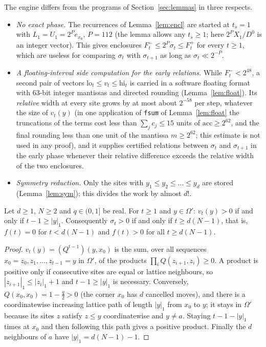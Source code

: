 The engine differs from the programs of Section~\ref{sec:lemmas} in three respects.
\begin{itemize}
\item[(i)] \emph{No exact phase.} The recurrences of Lemma~\ref{lem:encl} are started at $t_s=1$ with $L_1=U_1=2^Pe_{x_0}$, $P=112$ (the lemma allows any $t_s\ge1$; here $2^PX_1/D^0$ is an integer vector). This gives enclosures $F^-_t\le2^P\sigma_t\le F^+_t$ for every $t\ge1$, which are useless for comparing $\sigma_t$ with $\sigma_{t+1}$ as long as $\sigma_t\ll2^{-P}$.
\item[(ii)] \emph{A floating-interval side computation for the early relations.} While $F^-_t<2^{48}$, a second pair of vectors $\mathrm{lo}_t\le v_t\le\mathrm{hi}_t$ is carried in a software floating format with 63-bit integer mantissas and directed rounding (Lemma~\ref{lem:float}). Its \emph{relative} width at every site grows by at most about $2^{-58}$ per step, whatever the size of $v_t(y)$ (in one application of \texttt{fsum} of Lemma~\ref{lem:float} the truncations of the terms cost less than $\sum_jc_j\le15$ units of $\mathrm{acc}\ge2^{62}$, and the final rounding less than one unit of the mantissa $m\ge2^{62}$; this estimate is not used in any proof), and it supplies certified relations between $\sigma_t$ and $\sigma_{t+1}$ in the early phase whenever their relative difference exceeds the relative width of the two enclosures.
\item[(iii)] \emph{Symmetry reduction.} Only the sites with $y_1\le y_2\le\dots\le y_d$ are stored (Lemma~\ref{lem:sym}); this divides the work by almost $d!$.
\end{itemize}

\begin{lemma}\label{lem:support}
Let $d\ge1$, $N\ge2$ and $q\in(0,1]$ be real. For $t\ge1$ and $y\in\Omega'$: $v_t(y)>0$ if and only if $t-1\ge|y|_1$. Consequently $\sigma_t>0$ if and only if $t\ge d(N-1)$, that is, $f(t)=0$ for $t<d(N-1)$ and $f(t)>0$ for all $t\ge d(N-1)$.
\end{lemma}
\begin{proof}
$v_t(y)=(Q^{t-1})(y,x_0)$ is the sum, over all sequences $x_0=z_0,z_1,\dots,z_{t-1}=y$ in $\Omega'$, of the products $\prod_iQ(z_{i+1},z_i)\ge0$. A product is positive only if consecutive sites are equal or lattice neighbours, so $|z_{i+1}|_1\le|z_i|_1+1$ and $t-1\ge|y|_1$ is necessary. Conversely, $Q(x_0,x_0)=1-\frac q2>0$ (the corner $x_0$ has $d$ cancelled moves), and there is a coordinatewise increasing lattice path of length $|y|_1$ from $x_0$ to $y$; it stays in $\Omega'$ because its sites $z$ satisfy $z\le y$ coordinatewise and $y\ne a$. Staying $t-1-|y|_1$ times at $x_0$ and then following this path gives a positive product. Finally the $d$ neighbours of $a$ have $|y|_1=d(N-1)-1$.
\end{proof}

